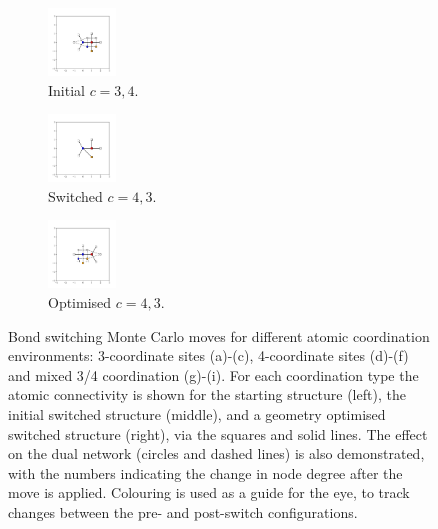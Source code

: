 \begin{figure}[bt]
     \vspace{5mm}
     \begin{subfigure}[b]{0.25\textwidth}
         \centering
         \includegraphics[height=1.8cm]{./figures/general_networks/bs_move_g.pdf}
         \caption{Initial $c=3,4$.}
         \label{fig:bsmoveg}
     \end{subfigure}
     \hfill
     \begin{subfigure}[b]{0.25\textwidth}
         \centering
         \includegraphics[height=1.8cm]{./figures/general_networks/bs_move_h.pdf}
         \caption{Switched $c=4,3$.}
         \label{fig:bsmoveh}
     \end{subfigure}
     \hfill
     \begin{subfigure}[b]{0.25\textwidth}
         \centering
         \includegraphics[height=1.8cm]{./figures/general_networks/bs_move_i.pdf}
         \caption{Optimised $c=4,3$.}
         \label{fig:bsmovei}
     \end{subfigure}
     
     \caption{Bond switching Monte Carlo moves for different atomic coordination environments: 3\--coordinate sites (a)-(c), 4\--coordinate sites (d)-(f) and mixed 3/4 coordination (g)-(i). For each coordination type the atomic connectivity is shown for the starting structure (left), the initial switched structure (middle), and a geometry optimised switched structure (right), via the squares and solid lines. The effect on the dual network (circles and dashed lines) is also demonstrated, with the numbers indicating the change in node degree after the move is applied. Colouring is used as a guide for the eye, to track changes between the pre\-- and post\--switch configurations.
}
     \label{fig:bsmoves}
\end{figure}

